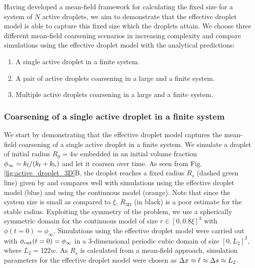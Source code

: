 Having developed a mean-field framework for calculating the fixed size for a system of $N$ active droplets, we aim to demonstrate that the effective droplet model is able to capture this fixed size which the droplets attain.
We choose three different mean-field coarsening scenarios in increasing complexity and compare simulations using the effective droplet model with the analytical predictions:

\begin{enumerate}
    \item A single active droplet in a finite system.
    
    \item A pair of active droplets coarsening in a large and a finite system.

    \item Multiple active droplets coarsening in a large and a finite system.
    \end{enumerate}


\subsubsection{Coarsening of a single active droplet in a finite system}

We start by demonstrating that the effective droplet model captures the mean-field coarsening of a single active droplet in a finite system.
We simulate a droplet of initial radius $R_0 = 4 w$ embedded in an initial volume fraction $\phi_\infty = k_\mathrm{f}/(k_\mathrm{f} + k_\mathrm{b})$ and let it coarsen over time.
As seen from Fig. \ref{fig:active_droplet_3D}B, the droplet reaches a fixed radius $R_s$ (dashed green line) given by  and compares well with simulations using the effective droplet model (blue) and using the continuous model (orange).
Note that since the system size is small as compared to $\xi$, $\overline{R}_\mathrm{3D}$ (in black) is a poor estimate for the stable radius. 
Exploiting the symmetry of the problem, we use a spherically symmetric domain for the continuous model of size $r \in [0, 0.8 \xi]^3$ with $\phi(t=0) =\phi_\infty$.
Simulations using the effective droplet model were carried out with $\phi_\mathrm{out}(t=0) = \phi_\infty$ in a $3$-dimensional periodic cubic domain of size $[0, L_2]^3$, where $L_2 = 122w$.
As $R_s$ is calculated from a mean-field approach, simulation parameters for the effective droplet model were chosen as $\Delta x \approx \ell \approx \Delta s \approx L_2$.

